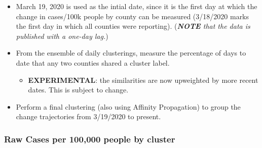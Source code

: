 \documentclass[]{article}
\providecommand{\tightlist}{%
  \setlength{\itemsep}{0pt}\setlength{\parskip}{0pt}}
\begin{document}
\begin{itemize}
\item
  March 19, 2020 is used as the intial date, since it is the first day
  at which the change in cases/100k people by county can be measured
  (3/18/2020 marks the first day in which all counties were reporting).
  (\emph{\textbf{NOTE} that the data is published with a one-day lag.})
\item
  From the ensemble of daily clusterings, measure the percentage of days
  to date that any two counties shared a cluster label.

  \begin{itemize}
  \tightlist
  \item
    \textbf{EXPERIMENTAL}: the similarities are now upweighted by more
    recent dates. This is subject to change.
  \end{itemize}
\item
  Perform a final clustering (also using Affinity Propagation) to group
  the change trajectories from 3/19/2020 to present.
\end{itemize}

\hypertarget{raw-cases-per-100000-people-by-cluster}{%
\subsubsection{Raw Cases per 100,000 people by
cluster}\label{raw-cases-per-100000-people-by-cluster}}
\end{document}
